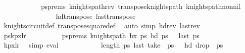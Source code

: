 \begin{isabellebody}
\ \ \ \ \ \ \ \ \ \ \isamarkupfalse%
\ psprems\ knights{\isacharunderscore}{\kern0pt}path{\isacharunderscore}{\kern0pt}rev\ transpose{\isacharunderscore}{\kern0pt}knights{\isacharunderscore}{\kern0pt}path\ knights{\isacharunderscore}{\kern0pt}path{\isacharunderscore}{\kern0pt}non{\isacharunderscore}{\kern0pt}nil\ \isanewline
\ \ \ \ \ \ \ \ \ \ \ \ \ \ \ \ hd{\isacharunderscore}{\kern0pt}transpose\ last{\isacharunderscore}{\kern0pt}transpose\ \isanewline
\ \ \ \ \ \ \ \ \ \ \isamarkupfalse%
\ knights{\isacharunderscore}{\kern0pt}circuit{\isacharunderscore}{\kern0pt}def\ transpose{\isacharunderscore}{\kern0pt}square{\isacharunderscore}{\kern0pt}def\ \isamarkupfalse%
\ {\isacharparenleft}{\kern0pt}auto\ simp{\isacharcolon}{\kern0pt}\ hd{\isacharunderscore}{\kern0pt}rev\ last{\isacharunderscore}{\kern0pt}rev{\isacharparenright}{\kern0pt}\isanewline
\isanewline
\ \ \ \ \ \ \ \ \isamarkupfalse%
\ {\isacharquery}{\kern0pt}pskp{}x{}lr{\isachardoublequoteclose}\isanewline
\ \ \ \ \ \ \ \ \isamarkupfalse%
\ psprems{\isacharcolon}{\kern0pt}\ {\isachardoublequoteopen}knights{\isacharunderscore}{\kern0pt}path\ b{}x{}\ {\isacharquery}{\kern0pt}ps\ {\isachardoublequoteopen}hd\ {\isacharquery}{\kern0pt}ps\ {\isacharequal}{\kern0pt}\ {\isacharparenleft}{\kern0pt}{}{\isacharcomma}{\kern0pt}{}{\isacharparenright}{\kern0pt}{\isachardoublequoteclose}\ {\isachardoublequoteopen}last\ {\isacharquery}{\kern0pt}ps\ {\isacharequal}{\kern0pt}\ {\isacharparenleft}{\kern0pt}{}{\isacharcomma}{\kern0pt}{}{\isacharparenright}{\kern0pt}{\isachardoublequoteclose}\isanewline
\ \ \ \ \ \ \ \ \ \ \isamarkupfalse%
\ kp{\isacharunderscore}{\kern0pt}{}x{}{\isacharunderscore}{\kern0pt}lr\ \isamarkupfalse%
\ simp\ eval{\isacharplus}{\kern0pt}\isanewline
\isanewline
\ \ \ \ \ \ \ \ \isamarkupfalse%
\ {\isachardoublequoteopen}{}{}\ {\isacharless}{\kern0pt}\ length\ {\isacharquery}{\kern0pt}ps\ {\isachardoublequoteopen}last\ {\isacharparenleft}{\kern0pt}take\ {}{}\ {\isacharquery}{\kern0pt}ps\ {\isacharequal}{\kern0pt}\ {\isacharparenleft}{\kern0pt}{}{\isacharcomma}{\kern0pt}{}{\isacharparenright}{\kern0pt}{\isachardoublequoteclose}\ {\isachardoublequoteopen}hd\ {\isacharparenleft}{\kern0pt}drop\ {}{}\ {\isacharquery}{\kern0pt}ps\ {\isacharequal}{\kern0pt}\ {\isacharparenleft}{\kern0pt}{}{\isacharcomma}{\kern0pt}{}{\isacharparenright}{\kern0pt}{\isachardoublequoteclose}\ \isamarkupfalse%

\end{isabellebody}
